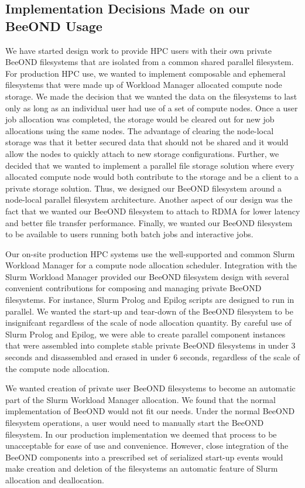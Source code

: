 \subsection{Implementation Decisions Made on our BeeOND Usage}

We have started design work to provide HPC users with their own private BeeOND filesystems that are isolated from a common shared parallel filesystem.  For production HPC use, we wanted to implement composable and ephemeral filesystems that were made up of Workload Manager allocated compute node storage.  We made the decision that we wanted the data on the filesystems to last only as long as an individual user had use of a set of compute nodes.  Once a user job allocation was completed, the storage would be cleared out for new job allocations using the same nodes.  The advantage of clearing the node-local storage was that it better secured data that should not be shared and it would allow the nodes to quickly attach to new storage configurations.  Further, we decided that we wanted to implement a parallel file storage solution where every allocated compute node would both contribute to the storage and be a client to a private storage solution.  Thus, we designed our BeeOND filesystem around a node-local parallel filesystem architecture.  Another aspect of our design was the fact that we wanted our BeeOND filesystem to attach to RDMA for lower latency and better file transfer performance.  Finally, we wanted our BeeOND filesystem to be available to users running both batch jobs and interactive jobs.  

Our on-site production HPC systems use the well-supported and common Slurm Workload Manager for a compute node allocation scheduler. Integration with the Slurm Workload Manager provided our BeeOND filesystem design with several convenient contributions for composing and managing private BeeOND filesystems.  For instance, Slurm Prolog and Epilog scripts are designed to run in parallel. We wanted the start-up and tear-down of the BeeOND filesystem to be insignifcant regardless of the scale of node allocation quantity. By careful use of Slurm Prolog and Epilog, we were able to create parallel component instances that were assembled into complete stable private BeeOND filesystems in under 3 seconds and disassembled and erased in under 6 seconds, regardless of the scale of the compute node allocation.  

We wanted creation of private user BeeOND filesystems  to become an automatic part of the Slurm Workload Manager allocation. We found that the normal implementation of BeeOND would not fit our needs.  Under the normal BeeOND filesystem operations, a user would need to manually start the BeeOND filesystem.  In our production implementation we deemed that process to be unacceptable for ease of use and convenience.  However, close integration of the BeeOND components into a prescribed set of serialized start-up events would make creation and deletion of the filesystems an automatic feature of Slurm allocation and deallocation. 

